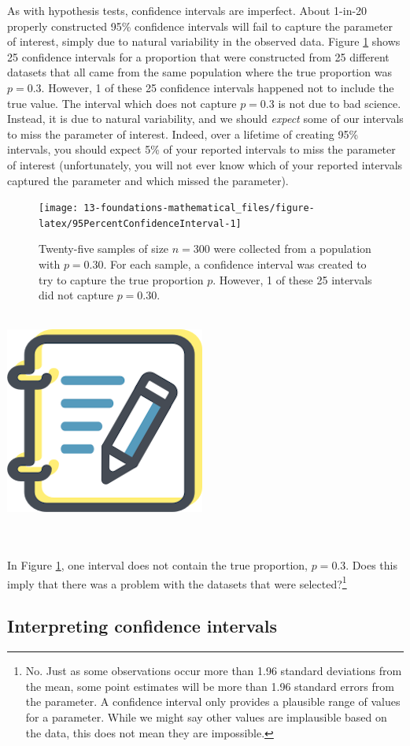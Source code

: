 \documentclass[
  10pt,
  openany]{book}
\newenvironment{mdframedwithfootGPWE}
{   
    \savenotes
    \begin{mdframed}[%
    topline=true, bottomline=true, linecolor=oiB, linewidth=0.5pt,
    rightline=false, leftline=false,
    backgroundcolor=oiLGray]
    \renewcommand{\thempfootnote}{\arabic{footnote}}
    }
{
    \end{mdframed}
    \spewnotes
}
\newenvironment{guidedpractice}{
\vspace{4mm}
\begin{mdframedwithfootGPWE}
\begin{minipage}[t]{0.10\textwidth}
{$\:$ \\ \setkeys{Gin}{width=2.5em,keepaspectratio}\includegraphics{images/_icons/guided-practice.png}}
\end{minipage}
\hfill
\begin{minipage}[t]{0.90\textwidth}
\vspace{-2mm}
\setlength{\parskip}{1em}
\noindent\textbf{\color{oiB}\small\fontfamily{phv}\selectfont{\MakeUppercase{Guided Practice}}} $\:$ \\ \\
}{\end{minipage}
\end{mdframedwithfootGPWE}
\vspace{4mm}
}
\begin{document}
As with hypothesis tests, confidence intervals are imperfect.
About 1-in-20 properly constructed 95\% confidence intervals will fail to capture the parameter of interest, simply due to natural variability in the observed data.
Figure \ref{fig:95PercentConfidenceInterval} shows 25 confidence intervals for a proportion that were constructed from 25 different datasets that all came from the same population where the true proportion was \(p = 0.3.\) However, 1 of these 25 confidence intervals happened not to include the true value.
The interval which does not capture \(p=0.3\) is not due to bad science.
Instead, it is due to natural variability, and we should \emph{expect} some of our intervals to miss the parameter of interest.
Indeed, over a lifetime of creating 95\% intervals, you should expect 5\% of your reported intervals to miss the parameter of interest (unfortunately, you will not ever know which of your reported intervals captured the parameter and which missed the parameter).

\begin{figure}[h]

{\centering \texttt{[image: 13-foundations-mathematical\_files/figure-latex/95PercentConfidenceInterval-1]} 

}

\caption{Twenty-five samples of size $n=300$ were collected from a population with $p = 0.30.$ For each sample, a confidence interval was created to try to capture the true proportion $p.$ However, 1 of these 25 intervals did not capture $p = 0.30.$}\label{fig:95PercentConfidenceInterval}
\end{figure}

\begin{guidedpractice}
In Figure \ref{fig:95PercentConfidenceInterval}, one interval does not contain the true proportion, \(p = 0.3.\) Does this imply that there was a problem with the datasets that were selected?\footnote{No.
  Just as some observations occur more than 1.96 standard deviations from the mean, some point estimates will be more than 1.96 standard errors from the parameter.
  A confidence interval only provides a plausible range of values for a parameter.
  While we might say other values are implausible based on the data, this does not mean they are impossible.}

\end{guidedpractice}

\hypertarget{interpreting-confidence-intervals}{%
\subsection{Interpreting confidence intervals}\label{interpreting-confidence-intervals}}
\end{document}
